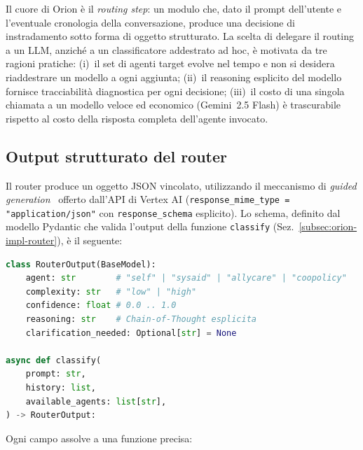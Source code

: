 Il cuore di Orion è il \emph{routing step}: un modulo che,
dato il prompt dell'utente e l'eventuale cronologia della conversazione,
produce una decisione di instradamento sotto forma di oggetto strutturato.
La scelta di delegare il routing a un LLM, anziché a un classificatore addestrato ad hoc,
è motivata da tre ragioni pratiche: (i)~il set di agenti target evolve nel tempo
 e non si desidera riaddestrare un modello a ogni aggiunta; (ii)~il reasoning esplicito del modello
 fornisce tracciabilità diagnostica per ogni decisione; (iii)~il costo di una singola chiamata
 a un modello veloce ed economico (Gemini~2.5 Flash) è trascurabile rispetto al costo
 della risposta completa dell'agente invocato.

\subsection{Output strutturato del router}
\label{subsec:orion-output-strutturato}

Il router produce un oggetto JSON vincolato,
utilizzando il meccanismo di \emph{guided generation}~\cite{willard2023outlines} offerto dall'API di
Vertex AI (\texttt{response\_mime\_type = "application/json"} con \texttt{response\_schema} esplicito).
Lo schema, definito dal modello Pydantic che valida l'output della funzione
\texttt{classify} (Sez.~\ref{subsec:orion-impl-router}), è il seguente:

\begin{lstlisting}[language=Python,caption={Schema dell'output strutturato del router e firma della funzione \texttt{classify}.},label={lst:classify-signature}]
class RouterOutput(BaseModel):
    agent: str        # "self" | "sysaid" | "allycare" | "coopolicy"
    complexity: str   # "low" | "high"
    confidence: float # 0.0 .. 1.0
    reasoning: str    # Chain-of-Thought esplicita
    clarification_needed: Optional[str] = None

async def classify(
    prompt: str,
    history: list,
    available_agents: list[str],
) -> RouterOutput:
\end{lstlisting}

Ogni campo assolve a una funzione precisa:

